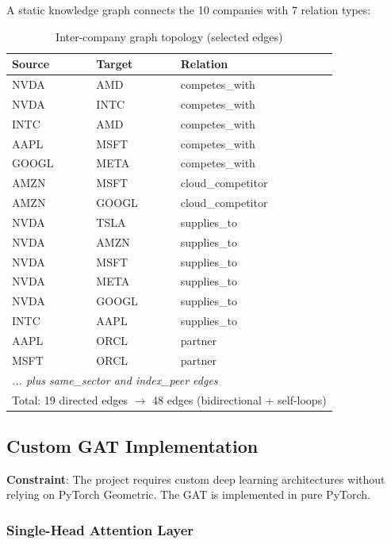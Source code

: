\documentclass[12pt,a4paper]{article}
\begin{document}
A static knowledge graph connects the 10 companies with 7 relation types:

\begin{table}[H]
\centering
\begin{tabular}{lll}
\toprule
\textbf{Source} & \textbf{Target} & \textbf{Relation} \\
\midrule
NVDA & AMD & competes\_with \\
NVDA & INTC & competes\_with \\
INTC & AMD & competes\_with \\
AAPL & MSFT & competes\_with \\
GOOGL & META & competes\_with \\
AMZN & MSFT & cloud\_competitor \\
AMZN & GOOGL & cloud\_competitor \\
NVDA & TSLA & supplies\_to \\
NVDA & AMZN & supplies\_to \\
NVDA & MSFT & supplies\_to \\
NVDA & META & supplies\_to \\
NVDA & GOOGL & supplies\_to \\
INTC & AAPL & supplies\_to \\
AAPL & ORCL & partner \\
MSFT & ORCL & partner \\
\multicolumn{3}{l}{\textit{... plus same\_sector and index\_peer edges}} \\
\midrule
\multicolumn{3}{l}{Total: 19 directed edges $\rightarrow$ 48 edges (bidirectional + self-loops)} \\
\bottomrule
\end{tabular}
\caption{Inter-company graph topology (selected edges)}
\label{tab:graph_edges}
\end{table}

\subsection{Custom GAT Implementation}

\textbf{Constraint}: The project requires custom deep learning architectures without relying on PyTorch Geometric. The GAT is implemented in pure PyTorch.

\subsubsection{Single-Head Attention Layer}
\end{document}
